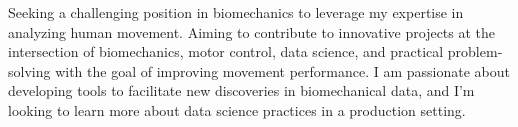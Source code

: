 \small{
Seeking a challenging position in biomechanics to leverage my expertise in analyzing human movement. Aiming to contribute to innovative projects at the intersection of biomechanics, motor control, data science, and practical problem-solving with the goal of improving movement performance. I am passionate about developing tools to facilitate new discoveries in biomechanical data, and I'm looking to learn more about data science practices in a production setting.
}